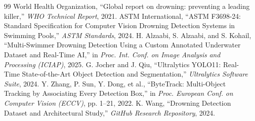 \documentclass[a4paper,11pt]{article}
\begin{document}
\begin{thebibliography}{99}
 World Health Organization, ``Global report on drowning: preventing a leading killer,'' \textit{WHO Technical Report}, 2021.
 ASTM International, ``ASTM F3698-24: Standard Specification for Computer Vision Drowning Detection Systems in Swimming Pools,'' \textit{ASTM Standards}, 2024.
 H. Alzaabi, S. Alzaabi, and S. Kohail, ``Multi-Swimmer Drowning Detection Using a Custom Annotated Underwater Dataset and Real-Time AI,'' in \textit{Proc. Int. Conf. on Image Analysis and Processing (ICIAP)}, 2025.
 G. Jocher and J. Qiu, ``Ultralytics YOLO11: Real-Time State-of-the-Art Object Detection and Segmentation,'' \textit{Ultralytics Software Suite}, 2024.
 Y. Zhang, P. Sun, Y. Dong, et al., ``ByteTrack: Multi-Object Tracking by Associating Every Detection Box,'' in \textit{Proc. European Conf. on Computer Vision (ECCV)}, pp. 1--21, 2022.
 K. Wang, ``Drowning Detection Dataset and Architectural Study,'' \textit{GitHub Research Repository}, 2024.
\end{thebibliography}
\end{document}

